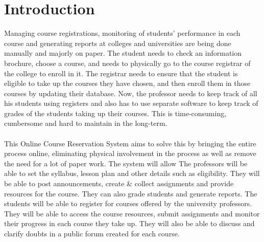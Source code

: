 \documentclass[12pt, a4]{report}
\begin{document}
\maketitle
\tableofcontents


\newpage
\chapter{Introduction}
Managing course registrations, monitoring of students' performance in each course and generating reports at colleges and universities are being done manually and majorly on paper. The student needs to check an information brochure, choose a course, and needs to physically go to the course registrar of the college to enroll in it. The registrar needs to ensure that the student is eligible to take up the courses they have chosen, and then enroll them in those courses by updating their database. Now, the professor needs to keep track of all his students using registers and also has to use separate software to keep track of grades of the students taking up their courses. This is time-consuming, cumbersome and hard to maintain in the long-term.
\\\\
This Online Course Reservation System aims to solve this by bringing the entire process online, eliminating physical involvement in the process as well as remove the need for a lot of paper work.
The system will allow The professors will be able to set the syllabus, lesson plan and other details such as eligibility. They will be able to post announcements, create \& collect assignments and provide resources for the course. They can also grade students and generate reports.
The students will be able to register for courses offered by the university professors. They will be able to access the course resources, submit assignments and monitor their progress in each course they take up. They will also be able to discuss and clarify doubts in a public forum created for each course.

\end{document}
